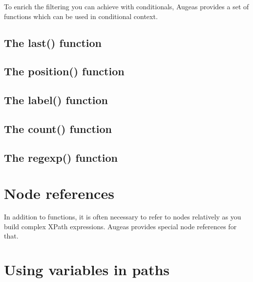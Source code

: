 
To enrich the filtering you can achieve with conditionals, Augeas provides a set of functions which can be used in conditional context.

\subsection{The last() function}


\subsection{The position() function}


\subsection{The label() function}


\subsection{The count() function}


\subsection{The regexp() function}



\section{Node references}

In addition to functions, it is often necessary to refer to nodes relatively as you build complex XPath expressions. Augeas provides special node references for that.

\section{Using variables in paths}

